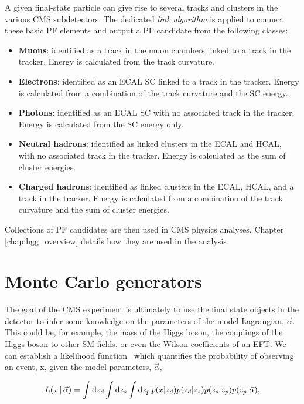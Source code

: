 A given final-state particle can give rise to several tracks and clusters in the various CMS subdetectors. The dedicated \textit{link algorithm} is applied to connect these basic PF elements and output a PF candidate from the following classes:
\begin{itemize}
    \item \textbf{Muons}: identified as a track in the muon chambers linked to a track in the tracker. Energy is calculated from the track curvature.
    \item \textbf{Electrons}: identified as an ECAL SC linked to a track in the tracker. Energy is calculated from a combination of the track curvature and the SC energy. 
    \item \textbf{Photons}: identified as an ECAL SC with no associated track in the tracker. Energy is calculated from the SC energy only.
    \item \textbf{Neutral hadrons}: identified as linked clusters in the ECAL and HCAL, with no associated track in the tracker. Energy is calculated as the sum of cluster energies.
    \item \textbf{Charged hadrons}: identified as linked clusters in the ECAL, HCAL, and a track in the tracker. Energy is calculated from a combination of the track curvature and the sum of cluster energies.
\end{itemize}
\noindent
Collections of PF candidates are then used in CMS physics analyses. Chapter \ref{chap:hgg_overview} details how they are used in the \Hgg analysis

\section{Monte Carlo generators}\label{sec:mc}
The goal of the CMS experiment is ultimately to use the final state objects in the detector to infer some knowledge on the parameters of the model Lagrangian, $\vec{\alpha}$. This could be, for example, the mass of the Higgs boson, the couplings of the Higgs boson to other SM fields, or even the Wilson coefficients of an EFT. We can establish a likelihood function~\cite{Brehmer:2020cvb} which quantifies the probability of observing an event, x, given the model parameters, $\vec{\alpha}$,

\begin{equation}\label{eq:mc_integral}
    L(x\,|\,\vec{\alpha}) = \int {\rm{d}}z_d \int {\rm{d}}z_s \int {\rm{d}}z_p \, p(x|z_d)p(z_d|z_s)p(z_s|z_p)p(z_p|\vec{\alpha}),
\end{equation}

